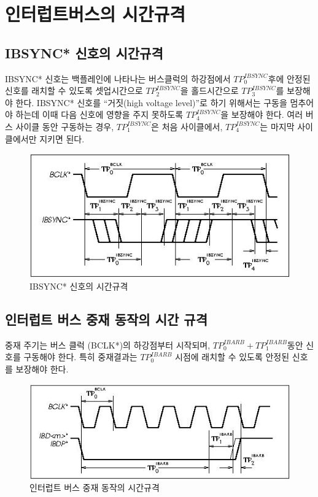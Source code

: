 \section{인터럽트버스의 시간규격}
%
\subsection{IBSYNC* 신호의 시간규격}
IBSYNC* 신호는
백플레인에 나타나는 버스클럭의 하강점에서 $TP^{IBSYNC}_0$후에
안정된 신호를 래치할 수 있도록 셋업시간으로 $TP^{IBSYNC}_2$을
홀드시간으로 $TP^{IBSYNC}_3$를 보장해야 한다.
IBSYNC* 신호를 ``거짓(high voltage level)''로 하기 위해서는
구동을 멈추어야 하는데 이때 다음 신호에 영향을 주지 못하도록 $TP^{IBSYNC}_4$을
보장해야 한다. 여러 버스 사이클 동안 구동하는 경우, $TP^{IBSYNC}_1$은
처음 사이클에서, $TP^{IBSYNC}_4$는 마지막 사이클에서만 지키면 된다.

\begin{figure}[htb]
    \centerline{\includegraphics{ch6/FIG/ibsync-time.jpg}}
   \caption{IBSYNC* 신호의 시간규격}\label{figure:ibsync-time}
\end{figure}
%
%
\subsection{인터럽트 버스 중재 동작의 시간 규격}
중재 주기는 버스 클럭 (BCLK*)의 하강점부터 시작되며,
$TP^{IBARB}_0 + TP^{IBARB}_1$동안 신호를 구동해야 한다.
특히 중재결과는 $TP^{IBARB}_0$ 시점에 래치할 수 있도록 안정된 신호를
보장해야 한다.

\begin{figure}[htb]
    \centerline{\includegraphics{ch6/FIG/ibarb-time.jpg}}
   \caption{인터럽트 버스 중재 동작의 시간규격}\label{figure:ibarb-time}
\end{figure}
%

